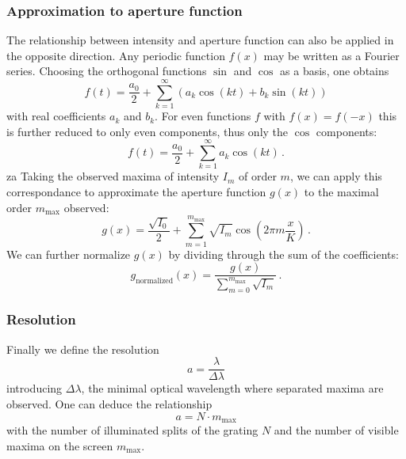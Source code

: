 \subsubsection{Approximation to aperture function}
The relationship between intensity and aperture function can also be applied in the 
opposite direction. Any periodic function $f(x)$ may be written as a Fourier series. 
Choosing the orthogonal functions $\sin$ and $\cos$ as a basis, one obtains 
\begin{equation}
    f(t)=\frac{a_{0}}{2}+\sum_{k=1}^{\infty}\left(a_{k}\cos\left(kt\right)+b_{k}\sin\left(kt\right)\right)
    \label{eq:fourier_series}
\end{equation}
with real coefficients $a_k$ and $b_k$. For even functions $f$ with $f(x) = f(-x)$ 
this is further reduced to only even components, thus only the $\cos$ components:
\begin{equation}
    f(t)=\frac{a_{0}}{2}+\sum_{k=1}^{\infty} a_{k}\cos\left(kt\right)\, .
    \label{eq:fourier_series_even}
\end{equation}za
Taking the observed maxima of intensity $I_m$ of order $m$, we can 
apply this correspondance to approximate the aperture function $g(x)$ 
to the maximal order $m_\mathrm{max}$ observed:
\begin{equation}
    g(x)=\frac{\sqrt{I_{0}}}{2}+\sum_{m=1}^{m_\mathrm{max}} \sqrt{I_m}\cos\left(2 \pi m \frac{x}{K}\right)\, .
    \label{eq:g_approx}
\end{equation}
We can further normalize $g(x)$ by dividing through the sum of the coefficients:
\begin{equation}
    g_\mathrm{normalized}(x)=\frac{g(x)}{\sum_{m=0}^{m_\mathrm{max}} \sqrt{I_m}}\, .
    \label{eq:g_approx}
\end{equation}

\subsubsection{Resolution}
\label{sec:resolution}
Finally we define the resolution
\begin{equation}
    a = \frac{\lambda}{\Delta \lambda}
\end{equation}
introducing $\Delta \lambda$, the minimal optical wavelength where separated maxima 
are observed. One can deduce the relationship
\begin{equation}
    a = N \cdot m_\mathrm{max}
    \label{eq:resolution}
\end{equation}
with the number of illuminated splits of the grating $N$ and the number of 
visible maxima on the screen $m_\mathrm{max}$.\cite{ver}
\FloatBarrier

